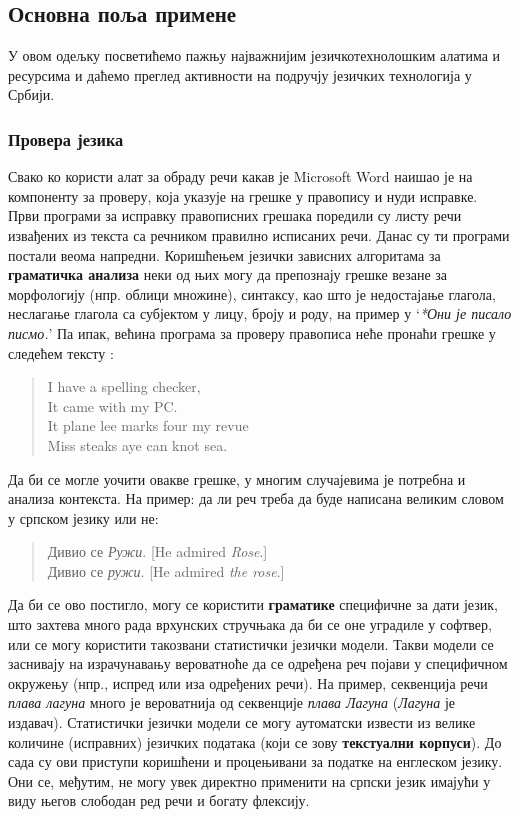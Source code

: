 {\begin{multicols}{2}
 \subsection {Основна поља примене}
   
   У овом одељку посветићемо пажњу најважнијим језичкотехнолошким алатима и ресурсима и даћемо преглед активности на подручју језичких технологија у Србији. %
 \subsubsection {Провера језика}
   
Свако ко користи алат за обраду речи какав је Microsoft Word наишао је на компоненту за проверу, која указује на грешке у правопису и нуди исправке. Први програми за исправку правописних грешака поредили су листу речи извађених из текста са речником правилно исписаних речи. Данас су ти програми постали веома напредни. Коришћењем језички зависних алгоритама за \textbf{граматичка анализа} неки од њих могу да препознају грешке везане за морфологију (нпр. облици множине), синтаксу, као што је недостајање глагола, неслагање глагола са субјектом у лицу, броју и роду, на пример у ‘\textit{*Они је писало писмо.}’ Па ипак, већина програма за проверу правописа неће пронаћи грешке у следећем тексту \cite{ZAR}: 

\begin{quote}
 I have a spelling checker, \\
 It came with my PC. \\
 It plane lee marks four my revue \\
 Miss steaks aye can knot sea.
\end{quote}

Да би се могле уочити овакве грешке, у многим случајевима је потребна и анализа контекста. На пример: да ли реч треба да буде написана великим словом у српском језику или не: 

\begin{quote}
Дивио се \textit{Ружи}. [He admired \textit{Rose}.] \\
Дивио се \textit{ружи}. [He admired \textit{the rose}.] 
\end{quote}

Да би се ово постигло, могу се користити \textbf{граматике} специфичне за дати језик, што захтева много рада врхунских стручњака да би се оне уградиле у софтвер, или се могу користити такозвани статистички језички модели. Такви модели се заснивају на израчунавању вероватноће да се одређена реч појави у специфичном окружењу (нпр., испред или иза одређених речи). На пример, секвенција речи \textit{плава лагуна} много је вероватнија од секвенције \textit{плава Лагуна} (\textit{Лагуна} је издавач). Статистички језички модели се могу аутоматски извести из велике количине (исправних) језичких података (који се зову \textbf{текстуални корпуси}). До сада су ови приступи коришћени и процењивани за податке на енглеском језику. Они се, међутим, не могу увек директно применити на српски језик имајући у виду његов слободан ред речи и богату флексију.  


\end{multicols}}
